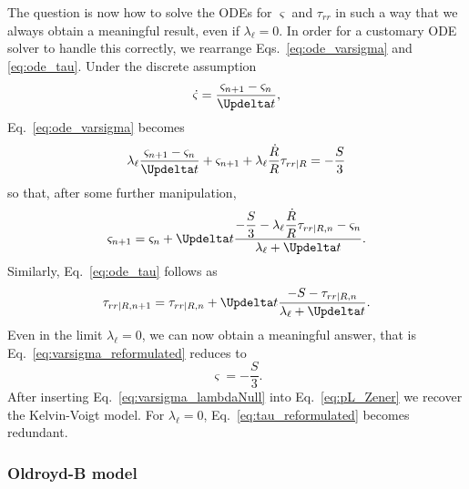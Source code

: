 The question is now how to solve the ODEs for $\varsigma$ and $\tau_{rr}$ in such a way that we always obtain a meaningful result, even if $\lambda_\ell=0$. In order for a customary ODE solver to handle this correctly, we rearrange Eqs.~\eqref{eq:ode_varsigma} and \eqref{eq:ode_tau}. Under the discrete assumption
\begin{equation}
    \dot{\varsigma}  = \frac{\varsigma_{n+1}-\varsigma_n}{\Updelta t},
\end{equation}
Eq.~\eqref{eq:ode_varsigma} becomes
\begin{equation}
    \lambda_\ell \frac{\varsigma_{n+1}-\varsigma_n}{\Updelta t} + \varsigma_{n+1} +\lambda_\ell \frac{\dot{R}}{R} {\tau}_{rr|R} = - \frac{S}{3}
  \end{equation}
so that, after some further manipulation,
\begin{equation}
    \varsigma_{n+1} =  \varsigma_n + \Updelta t \frac{- \dfrac{S}{3} - \lambda_\ell  \dfrac{\dot{R}}{R} {\tau}_{rr|R,n} - \varsigma_n}{\lambda_\ell + \Updelta t}. \label{eq:varsigma_reformulated}
  \end{equation}
Similarly, Eq.~\eqref{eq:ode_tau} follows as
\begin{equation}
   {\tau}_{rr|R,n+1} = {\tau}_{rr|R,n} + \Updelta t \frac{-S-{\tau}_{rr|R,n}}{\lambda_\ell + \Updelta t}.
   \label{eq:tau_reformulated}
\end{equation}
Even in the limit $\lambda_\ell = 0$, we can now obtain a meaningful answer, that is Eq.~\eqref{eq:varsigma_reformulated} reduces to
\begin{equation}
    \varsigma = -\frac{S}{3}. \label{eq:varsigma_lambdaNull}
\end{equation}
After inserting Eq.~\eqref{eq:varsigma_lambdaNull} into Eq.~\eqref{eq:pL_Zener} we recover the Kelvin-Voigt model. For $\lambda_\ell = 0$, Eq.~\eqref{eq:tau_reformulated} becomes redundant.

\subsubsection{Oldroyd-B model}

